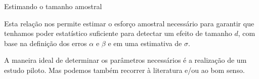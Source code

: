 \documentclass{beamer}\usepackage[]{graphicx}\usepackage[]{color}
\begin{document}
\begin{frame}{Estimando o tamanho amostral}

Esta relação nos permite estimar o esforço amostral necessário para garantir que tenhamos poder estatístico suficiente para detectar um efeito de tamanho $d$, com base na definição dos erros $\alpha$ e $\beta$ e em uma estimativa de $\sigma$.
  
  \vfill
  
  
  A maneira ideal de determinar os parâmetros necessários é a realização de um estudo piloto. Mas podemos também recorrer à literatura e/ou ao bom senso.

\end{frame}
\end{document}

